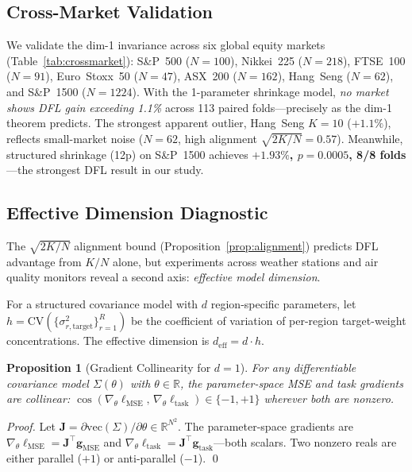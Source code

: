 \documentclass[letterpaper]{article}
\newtheorem{proposition}{Proposition}
\begin{document}
\subsection{Cross-Market Validation}

We validate the dim-1 invariance across six global equity markets (Table~\ref{tab:crossmarket}): S\&P~500 ($N{=}100$), Nikkei~225 ($N{=}218$), FTSE~100 ($N{=}91$), Euro~Stoxx~50 ($N{=}47$), ASX~200 ($N{=}162$), Hang~Seng ($N{=}62$), and S\&P~1500 ($N{=}1224$). With the 1-parameter shrinkage model, \emph{no market shows DFL gain exceeding 1.1\%} across 113 paired folds---precisely as the dim-1 theorem predicts. The strongest apparent outlier, Hang~Seng $K{=}10$ ($+1.1\%$), reflects small-market noise ($N{=}62$, high alignment $\sqrt{2K/N}{=}0.57$). Meanwhile, structured shrinkage (12p) on S\&P~1500 achieves \textbf{$+1.93\%$, $p{=}0.0005$, 8/8 folds}---the strongest DFL result in our study.

\subsection{Effective Dimension Diagnostic}
\label{sec:eff_dim}

The $\sqrt{2K/N}$ alignment bound (Proposition~\ref{prop:alignment}) predicts DFL advantage from $K/N$ alone, but experiments across weather stations and air quality monitors reveal a second axis: \emph{effective model dimension}.

\begin{definition}
For a structured covariance model with $d$ region-specific parameters, let $h = \text{CV}(\{\sigma^2_{r,\text{target}}\}_{r=1}^R)$ be the coefficient of variation of per-region target-weight concentrations. The effective dimension is $d_{\text{eff}} = d \cdot h$.
\end{definition}

\begin{proposition}[Gradient Collinearity for $d{=}1$]
\label{prop:dim1}
For any differentiable covariance model $\Sigma(\theta)$ with $\theta \in \mathbb{R}$, the parameter-space MSE and task gradients are collinear: $\cos(\nabla_\theta \ell_{\text{MSE}},\, \nabla_\theta \ell_{\text{task}}) \in \{-1, +1\}$ wherever both are nonzero.
\end{proposition}

\emph{Proof.} Let $\mathbf{J} = \partial\mathrm{vec}(\Sigma)/\partial\theta \in \mathbb{R}^{N^2}$. The parameter-space gradients are $\nabla_\theta \ell_{\text{MSE}} = \mathbf{J}^\top \mathbf{g}_{\text{MSE}}$ and $\nabla_\theta \ell_{\text{task}} = \mathbf{J}^\top \mathbf{g}_{\text{task}}$---both scalars. Two nonzero reals are either parallel ($+1$) or anti-parallel ($-1$). \qed
\end{document}
